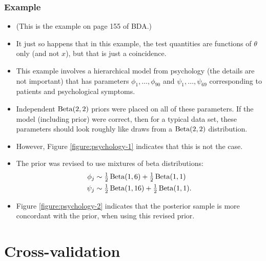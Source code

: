 \documentclass[12pt]{article}
\begin{document}
\subsubsection*{Example}
\begin{itemize}
\item (This is the example on page 155 of BDA.)
\item It just so happens that in this example, the test quantities are functions of $\theta$ only (and not $x$), but that is just a coincidence.
\item This example involves a hierarchical model from psychology (the details are not important) that has parameters $\phi_1,\ldots,\phi_{90}$ and $\psi_1,\ldots,\psi_{69}$ corresponding to patients and psychological symptoms.
\item Independent $\operatorname*{Beta}(2,2)$ priors were placed on all of these parameters. If the model (including prior) were correct, then for a typical data set, these parameters should look roughly like draws from a $\operatorname*{Beta}(2,2)$ distribution.
\item However, Figure \ref{figure:psychology-1} indicates that this is not the case.
\item The prior was revised to use mixtures of beta distributions:
\begin{align*}
\phi_j & \sim \tfrac{1}{2} \operatorname*{Beta}(1,6) + \tfrac{1}{2}\operatorname*{Beta}(1,1)\\
\psi_j & \sim \tfrac{1}{2} \operatorname*{Beta}(1,16) + \tfrac{1}{2}\operatorname*{Beta}(1,1).
\end{align*}
\item Figure \ref{figure:psychology-2} indicates that the posterior sample is more concordant with the prior, when using this revised prior.
\end{itemize}



\section{Cross-validation}
\end{document}
